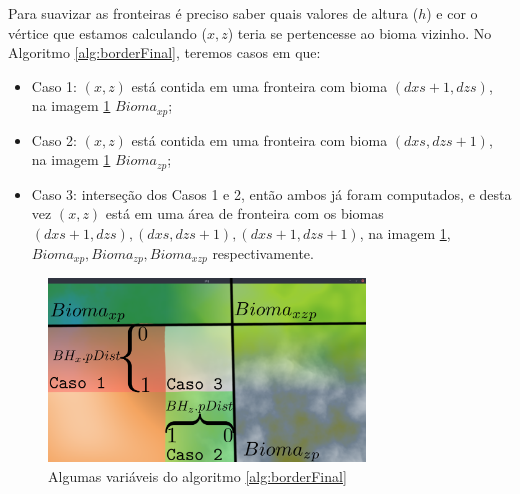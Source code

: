 Para suavizar as fronteiras é preciso saber quais valores de altura ($h$) e cor o
vértice que estamos calculando ($x, z$) teria se pertencesse ao bioma vizinho.
No Algoritmo \ref{alg:borderFinal}, teremos casos em que:
\begin{itemize}
    \item Caso 1: $(x, z)$ está contida em uma fronteira com bioma $(dxs+1, dzs)$, 
    na imagem \ref{fig:paralgborder} $Bioma_{xp}$;
    \item Caso 2: $(x, z)$ está contida em uma fronteira com bioma $(dxs, dzs+1)$, 
    na imagem \ref{fig:paralgborder} $Bioma_{zp}$;
    \item Caso 3: interseção dos Casos 1 e 2, então ambos já foram computados, 
    e desta vez $(x, z)$ está em uma área de fronteira com os biomas $(dxs+1, dzs), (dxs, dzs+1), (dxs+1, dzs+1)$, 
    na imagem \ref{fig:paralgborder}, $Bioma_{xp}, Bioma_{zp}, Bioma_{xzp}$ respectivamente.
\end{itemize}

\begin{figure}[H]
    \centering
    \includegraphics[width=0.75\textwidth]{figuras/border/yeah.png}
    \caption{Algumas variáveis do algoritmo \ref{alg:borderFinal}}
    \label{fig:paralgborder}
\end{figure}

